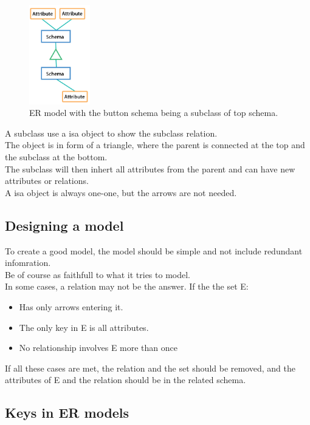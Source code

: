 \documentclass[12pt, a4paper]{article}
\begin{document}
		\begin{figure}[h]
			\centering
			\caption{ER model with the button schema being a subclass of top schema.}
			\includegraphics[width=100px]{assets/ERSubclass.png}
		\end{figure}
			A subclass use a isa object to show the subclass relation.\\
			The object is in form of a triangle, where the parent is connected at the top and the subclass at the bottom.\\
			The subclass will then inhert all attributes from the parent and can have new attributes or relations.\\
			A isa object is always one-one, but the arrows are not needed.
		\subsection{Designing a model}
			To create a good model, the model should be simple and not include redundant infomration.\\
			Be of course as faithfull to what it tries to model.\\
			In some cases, a relation may not be the answer. If the the set E:
			\begin{itemize}
						\item Has only arrows entering it.
						\item The only key in E is all attributes.
						\item No relationship involves E more than once
			\end{itemize}
			If all these cases are met, the relation and the set should be removed, and the attributes of E and the relation should be in the related schema.\\

			
		\subsection{Keys in ER models}
		
\end{document}
